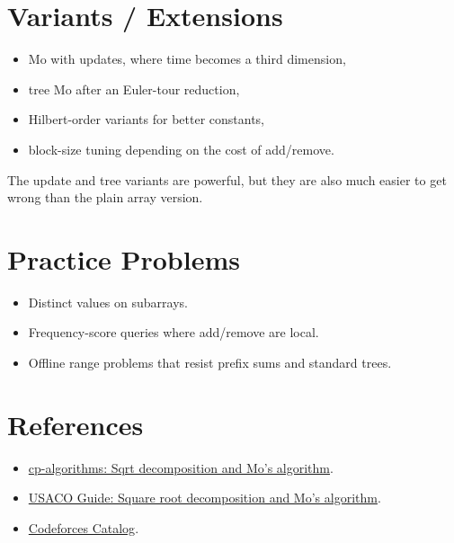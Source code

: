 \section*{Variants / Extensions}

\begin{itemize}
  \item Mo with updates, where time becomes a third dimension,
  \item tree Mo after an Euler-tour reduction,
  \item Hilbert-order variants for better constants,
  \item block-size tuning depending on the cost of add/remove.
\end{itemize}

The update and tree variants are powerful, but they are also much easier to get wrong than the plain array version.

\section*{Practice Problems}

\begin{itemize}
  \item Distinct values on subarrays.
  \item Frequency-score queries where add/remove are local.
  \item Offline range problems that resist prefix sums and standard trees.
\end{itemize}

\section*{References}

\begin{itemize}
  \item \href{https://cp-algorithms.com/data_structures/sqrt_decomposition.html}{cp-algorithms: Sqrt decomposition and Mo's algorithm}.
  \item \href{https://usaco.guide/plat/sqrt}{USACO Guide: Square root decomposition and Mo's algorithm}.
  \item \href{https://codeforces.com/catalog}{Codeforces Catalog}.
\end{itemize}
